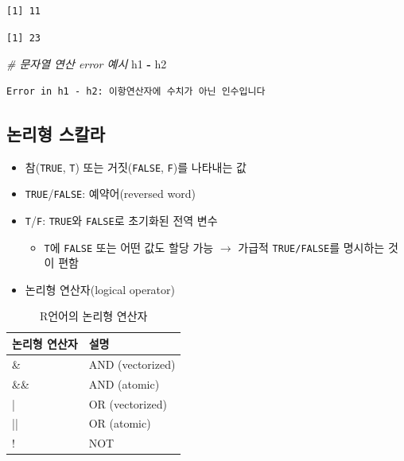 \documentclass[
  11pt,
]{krantz}
\newenvironment{Shaded}{\begin{snugshade}}{\end{snugshade}}
\newcommand{\CommentTok}[1]{\textcolor[rgb]{0.37,0.37,0.37}{\textit{#1}}}
\newcommand{\NormalTok}[1]{#1}
\newcommand{\OperatorTok}[1]{\textcolor[rgb]{0.43,0.43,0.43}{\textbf{#1}}}
\newcommand{\StringTok}[1]{\textcolor[rgb]{0.5,0.5,0.5}{#1}}
\providecommand{\tightlist}{%
  \setlength{\itemsep}{0pt}\setlength{\parskip}{0pt}}
\begin{document}
\begin{verbatim}
[1] 11
\end{verbatim}

\begin{verbatim}
[1] 23
\end{verbatim}

\begin{Shaded}
\begin{Highlighting}[]
\CommentTok{# 문자열 연산 error 예시}
\NormalTok{h1 }\OperatorTok{-}\StringTok{ }\NormalTok{h2}
\end{Highlighting}
\end{Shaded}

\begin{verbatim}
Error in h1 - h2: 이항연산자에 수치가 아닌 인수입니다
\end{verbatim}

\normalsize

\hypertarget{logical}{%
\subsection{논리형 스칼라}\label{logical}}

\begin{itemize}
\tightlist
\item
  참(\texttt{TRUE}, \texttt{T}) 또는 거짓(\texttt{FALSE}, \texttt{F})를 나타내는 값
\item
  \texttt{TRUE}/\texttt{FALSE}: 예약어(reversed word)
\item
  \texttt{T}/\texttt{F}: \texttt{TRUE}와 \texttt{FALSE}로 초기화된 전역 변수

  \begin{itemize}
  \tightlist
  \item
    \texttt{T}에 \texttt{FALSE} 또는 어떤 값도 할당 가능 \(\rightarrow\) 가급적 \texttt{TRUE/FALSE}를 명시하는 것이 편함
  \end{itemize}
\item
  논리형 연산자(logical operator)
\end{itemize}

\footnotesize

\begin{table}[H]

\caption{\label{tab:logic-op-tab}R언어의 논리형 연산자}
\centering
\fontsize{10}{12}\selectfont
\begin{tabular}[t]{>{\raggedright\arraybackslash}p{3cm}>{\raggedright\arraybackslash}p{7cm}}
\toprule
논리형 연산자 & 설명\\
\midrule
\rowcolor{gray!6}  \& & AND (vectorized)\\
\&\& & AND (atomic)\\
\rowcolor{gray!6}  | & OR (vectorized)\\
|| & OR (atomic)\\
\rowcolor{gray!6}  ! & NOT\\
\bottomrule
\end{tabular}
\end{table}
\end{document}
